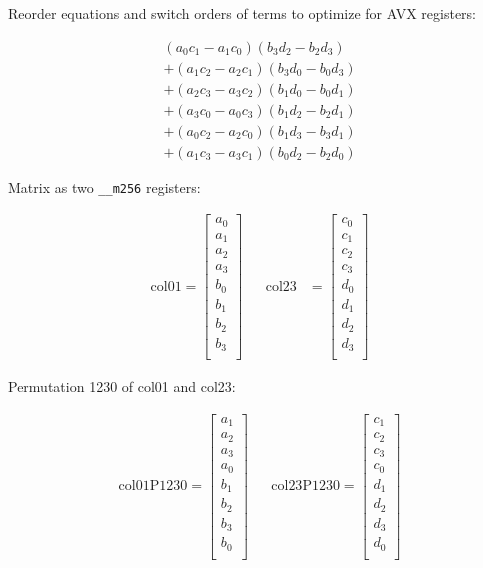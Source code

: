 \documentclass[fontsize = 10pt,DIV = 13]{scrartcl}
\newcommand{\pth}[1]{\left(#1\right)}
\begin{document}
Reorder equations and switch orders of terms to optimize for AVX registers:

\begin{align}
  \pth{a_0c_1 - a_1c_0} \pth{b_3d_2 - b_2d_3} \nonumber\\
+ \pth{a_1c_2 - a_2c_1} \pth{b_3d_0 - b_0d_3} \nonumber\\ 
+ \pth{a_2c_3 - a_3c_2} \pth{b_1d_0 - b_0d_1} \nonumber\\
+ \pth{a_3c_0 - a_0c_3} \pth{b_1d_2 - b_2d_1} \nonumber\\
+ \pth{a_0c_2 - a_2c_0} \pth{b_1d_3 - b_3d_1} \nonumber\\
+ \pth{a_1c_3 - a_3c_1} \pth{b_0d_2 - b_2d_0} 
\end{align}


Matrix as two \texttt{__m256} registers:

\begin{align*}
\mathrm{col01} 
=
\begin{bmatrix}
a_0\\
a_1\\
a_2\\
a_3\\
b_0\\
b_1\\
b_2\\
b_3\\
\end{bmatrix}
&&
\mathrm{col23} 
&=
\begin{bmatrix}
c_0\\
c_1\\
c_2\\
c_3\\
d_0\\
d_1\\
d_2\\
d_3\\
\end{bmatrix}
\end{align*}

Permutation 1230 of col01 and col23:

\begin{align*}
\mathrm{col01P1230} 
=
\begin{bmatrix}
a_1\\
a_2\\
a_3\\
a_0\\
b_1\\
b_2\\
b_3\\
b_0\\
\end{bmatrix}
&&
\mathrm{col23P1230} 
=
\begin{bmatrix}
c_1\\
c_2\\
c_3\\
c_0\\
d_1\\
d_2\\
d_3\\
d_0\\
\end{bmatrix}
\end{align*}
\end{document}
